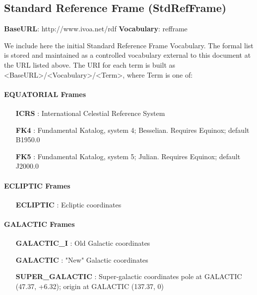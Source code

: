   \subsection{Standard Reference Frame (StdRefFrame)}
  \label{sect:StdRefFrame}

  \textbf{BaseURL}:  http://www.ivoa.net/rdf \newline
  \textbf{Vocabulary}: refframe \newline

  We include here the initial Standard Reference Frame Vocabulary.  The formal list is stored and maintained as a controlled vocabulary external to this document at the URL listed above.  The URI for each term is built as <BaseURL>/<Vocabulary>/<Term>, where Term is one of:

  \paragraph{EQUATORIAL Frames}
  \small
  \begin{itemize}
    \item[\textbf{ICRS}]:  International Celestial Reference System
    \item[\textbf{FK4}]:  Fundamental Katalog, system 4; Besselian. \newline Requires Equinox; default B1950.0
    \item[\textbf{FK5}]:  Fundamental Katalog, system 5; Julian. \newline Requires Equinox; default J2000.0
  \end{itemize}
  \normalsize

  \paragraph{ECLIPTIC Frames}
  \small
  \begin{itemize}
    \item[\textbf{ECLIPTIC}]:  Ecliptic coordinates
  \end{itemize}
  \normalsize

  \paragraph{GALACTIC Frames}
  \small
  \begin{itemize}
    \item[\textbf{GALACTIC\_I}]:  Old Galactic coordinates
    \item[\textbf{GALACTIC}]: "New" Galactic coordinates
    \item[\textbf{SUPER\_GALACTIC}]: Super-galactic coordinates \newline pole at GALACTIC (47.37, +6.32); origin at GALACTIC (137.37, 0)
  \end{itemize}
  \normalsize

